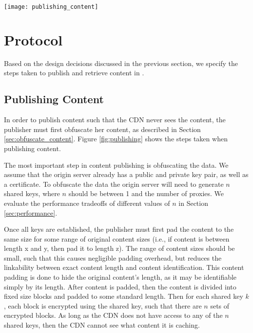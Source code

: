 \begin{figure*}[t!]
\centering
\texttt{[image: publishing\_content]}
\caption{Step-by-step instructions on how content is published in \system{}.}
\label{fig:publishing}
\end{figure*}

\section{\system{} Protocol}
\label{sec:protocol}
Based on the design decisions discussed in the previous section, we specify the 
steps taken to publish and retrieve content in \system{}.

\subsection{Publishing Content}
\label{sec:publish_protocol}
In order to publish content such that the CDN never sees the content, the publisher 
must first obfuscate her content, as described in Section \ref{sec:obfuscate_content}. 
Figure \ref{fig:publishing} shows the steps taken when publishing content.


The most important step in content publishing is obfuscating the data.  We assume that the origin 
server already has a public and private key pair, as well as a certificate.  To obfuscate the data 
the origin server will need to generate $n$ shared keys, where $n$ should be between 1 and the number of 
proxies.  We evaluate the performance tradeoffs of different values of $n$ in Section \ref{sec:performance}.  

Once all keys are established, the publisher must first pad the content to the same size for some 
range of original content sizes (i.e., if content is between length x and y, then pad it to length 
z).  The range of content sizes should be small, such that this causes negligible padding overhead, but 
reduces the linkability between exact content length and content identification.  This content padding is done to hide the original content's length, as it may be identifiable 
simply by its length.  After content is padded, then the content is divided into fixed size blocks and padded to 
some standard length.  Then for each shared key $k$, each block is encrypted using the shared key, 
such that there are $n$ sets of encrypted blocks. As long as the CDN does not have access to any 
of the $n$ shared keys, then the CDN cannot see what content it is caching.  

